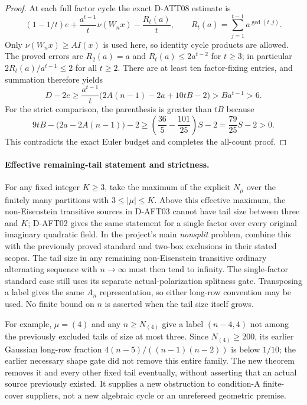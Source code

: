 \begin{proof}
At each full factor cycle the exact D-ATT08 estimate is
\[
 (1-1/t)e+\frac{a^{t-1}}t\nu(W_nx)-\frac{R_t(a)}t,
 \qquad R_t(a)=\sum_{j=1}^{t-1}a^{\gcd(t,j)}.            \tag{AFT.18}
\]
Only $\nu(W_nx)\ge AI(x)$ is used here, so identity cycle
products are allowed. The proved errors are $R_2(a)=a$
and $R_t(a)\le2a^{t-2}$ for $t\ge3$; in particular
$2R_t(a)/a^{t-1}\le2$ for all $t\ge2$.
There are at least ten factor-fixing entries, and summation
therefore yields
\[
 D-2e\ge\frac{a^{t-1}}t
       \bigl(2A(n-1)-2a+10tB-2\bigr)>B a^{t-1}>6.
                                                               \tag{AFT.19}
\]
For the strict comparison, the parenthesis is greater
than $tB$ because
\[
 9tB-\bigl(2a-2A(n-1)\bigr)-2
 \ge\left(\frac{36}{5}-\frac{101}{25}\right)S-2
 =\frac{79}{25}S-2>0.                                  \tag{AFT.20}
\]
This contradicts the exact Euler budget and completes
the all-count proof.
\end{proof}

\paragraph{Effective remaining-tail statement and strictness.}
For any fixed integer $K\ge3$, take the maximum of the
explicit $N_\mu$ over the finitely many partitions with
$3\le|\mu|\le K$. Above this effective maximum, the
non-Eisenstein transitive sources in D-AFT03 cannot have
tail size between three and $K$; D-AFT02 gives the same
statement for a single factor over every original
imaginary quadratic field. In the project's main
\emph{nonsplit} problem, combine this with the previously
proved standard and two-box exclusions in their stated
scopes. The tail size in any remaining non-Eisenstein
transitive ordinary alternating sequence with $n\to\infty$
must then tend to infinity. The single-factor standard
case still uses its separate actual-polarization splitness
gate. Transposing a label gives the same $A_n$
representation, so either long-row convention may be
used. No finite bound on $n$ is asserted when the tail
size itself grows.

For example, $\mu=(4)$ and any $n\ge N_{(4)}$ give a
label $(n-4,4)$ not among the previously excluded tails
of size at most three. Since $N_{(4)}\ge200$, its earlier
Gaussian long-row fraction
$4(n-5)/((n-1)(n-2))$ is below $1/10$; the earlier
necessary shape gate did not remove this entire family.
The new theorem removes it and every other fixed tail
eventually, without asserting that an actual source
previously existed. It supplies a new obstruction to
condition-A finite-cover suppliers, not a new algebraic
cycle or an unrefereed geometric premise.
